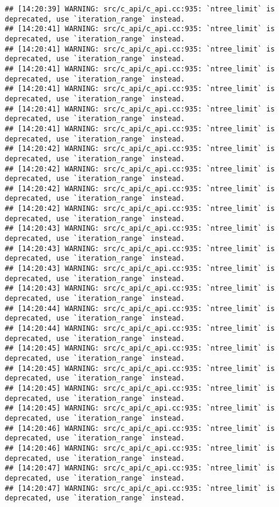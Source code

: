 \documentclass[
]{article}
\begin{document}
\begin{verbatim}
## [14:20:39] WARNING: src/c_api/c_api.cc:935: `ntree_limit` is deprecated, use `iteration_range` instead.
## [14:20:41] WARNING: src/c_api/c_api.cc:935: `ntree_limit` is deprecated, use `iteration_range` instead.
## [14:20:41] WARNING: src/c_api/c_api.cc:935: `ntree_limit` is deprecated, use `iteration_range` instead.
## [14:20:41] WARNING: src/c_api/c_api.cc:935: `ntree_limit` is deprecated, use `iteration_range` instead.
## [14:20:41] WARNING: src/c_api/c_api.cc:935: `ntree_limit` is deprecated, use `iteration_range` instead.
## [14:20:41] WARNING: src/c_api/c_api.cc:935: `ntree_limit` is deprecated, use `iteration_range` instead.
## [14:20:41] WARNING: src/c_api/c_api.cc:935: `ntree_limit` is deprecated, use `iteration_range` instead.
## [14:20:42] WARNING: src/c_api/c_api.cc:935: `ntree_limit` is deprecated, use `iteration_range` instead.
## [14:20:42] WARNING: src/c_api/c_api.cc:935: `ntree_limit` is deprecated, use `iteration_range` instead.
## [14:20:42] WARNING: src/c_api/c_api.cc:935: `ntree_limit` is deprecated, use `iteration_range` instead.
## [14:20:42] WARNING: src/c_api/c_api.cc:935: `ntree_limit` is deprecated, use `iteration_range` instead.
## [14:20:43] WARNING: src/c_api/c_api.cc:935: `ntree_limit` is deprecated, use `iteration_range` instead.
## [14:20:43] WARNING: src/c_api/c_api.cc:935: `ntree_limit` is deprecated, use `iteration_range` instead.
## [14:20:43] WARNING: src/c_api/c_api.cc:935: `ntree_limit` is deprecated, use `iteration_range` instead.
## [14:20:43] WARNING: src/c_api/c_api.cc:935: `ntree_limit` is deprecated, use `iteration_range` instead.
## [14:20:44] WARNING: src/c_api/c_api.cc:935: `ntree_limit` is deprecated, use `iteration_range` instead.
## [14:20:44] WARNING: src/c_api/c_api.cc:935: `ntree_limit` is deprecated, use `iteration_range` instead.
## [14:20:45] WARNING: src/c_api/c_api.cc:935: `ntree_limit` is deprecated, use `iteration_range` instead.
## [14:20:45] WARNING: src/c_api/c_api.cc:935: `ntree_limit` is deprecated, use `iteration_range` instead.
## [14:20:45] WARNING: src/c_api/c_api.cc:935: `ntree_limit` is deprecated, use `iteration_range` instead.
## [14:20:45] WARNING: src/c_api/c_api.cc:935: `ntree_limit` is deprecated, use `iteration_range` instead.
## [14:20:46] WARNING: src/c_api/c_api.cc:935: `ntree_limit` is deprecated, use `iteration_range` instead.
## [14:20:46] WARNING: src/c_api/c_api.cc:935: `ntree_limit` is deprecated, use `iteration_range` instead.
## [14:20:47] WARNING: src/c_api/c_api.cc:935: `ntree_limit` is deprecated, use `iteration_range` instead.
## [14:20:47] WARNING: src/c_api/c_api.cc:935: `ntree_limit` is deprecated, use `iteration_range` instead.

\end{verbatim}
\end{document}
